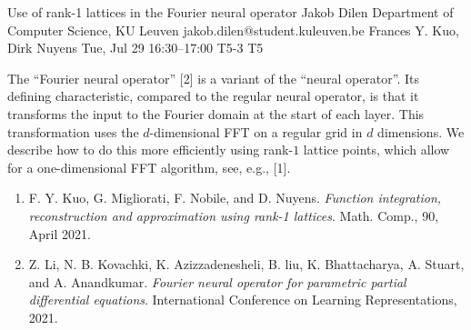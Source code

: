 \begin{talk}
\end{talk}

\begin{talk}
  {Use of rank-1 lattices in the Fourier neural operator}%
  {Jakob Dilen}%
  {Department of Computer Science, KU Leuven}%
  {jakob.dilen@student.kuleuven.be}%
  {Frances Y. Kuo, Dirk Nuyens}%
  {}%
  {Tue, Jul 29 16:30--17:00}%
  {T5-3}%
  {T5}%
  
    

The ``Fourier neural operator'' [2] is a variant of the ``neural operator''.
Its defining characteristic, compared to the regular neural operator, is that it transforms the input to the Fourier domain at the start of each layer. This transformation uses the $d$-dimensional FFT on a regular grid in $d$ dimensions. We describe how to do this more efficiently using rank-$1$ lattice points, which allow for a one-dimensional FFT algorithm, see, e.g., [1]. 

\medskip
\begin{enumerate}
        \item[{[1]}] F. Y. Kuo, G. Migliorati, F. Nobile, and D. Nuyens. \textit{Function integration,
reconstruction and approximation using rank-1 lattices}. Math. Comp., 90, April
2021.   
        \item[{[2]}] Z. Li, N. B. Kovachki, K. Azizzadenesheli, B. liu, K. Bhattacharya, A. Stuart,
and A. Anandkumar. \textit{Fourier neural operator for parametric partial differential
equations}. International Conference on Learning Representations, 2021.
\end{enumerate}
\end{talk}


